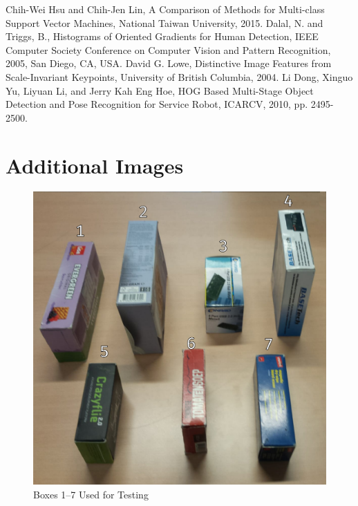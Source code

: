 \documentclass[letterpaper, 10 pt, conference]{conf/ieeeconf}  %
\begin{document}




\begin{thebibliography}{99}

 Chih-Wei Hsu and Chih-Jen Lin, A Comparison of Methods for
  Multi-class Support Vector Machines, National Taiwan University, 2015.
 Dalal, N. and Triggs, B., Histograms of Oriented Gradients
  for Human Detection, IEEE Computer Society Conference on Computer Vision and
  Pattern Recognition, 2005, San Diego, CA, USA.
 David G. Lowe, Distinctive Image Features from
  Scale-Invariant Keypoints, University of British Columbia, 2004.
 Li Dong, Xinguo Yu, Liyuan Li, and Jerry Kah Eng Hoe, HOG Based
  Multi-Stage Object Detection and Pose Recognition for Service Robot, ICARCV,
  2010, pp. 2495-2500.
\end{thebibliography}

\appendix
\section*{Additional Images}
\begin{figure}[H]
  \centering
  \includegraphics[width=0.9\linewidth]{test_boxes.png}
  \caption{\label{fig:test_boxes} Boxes 1--7 Used for Testing}
\end{figure}
\end{document}
